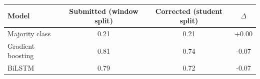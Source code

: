 \begin{tabular}{lccc}
\toprule
Model & Submitted (window split) & \textbf{Corrected (student split)} & $\Delta$ \\
\midrule
Majority class & 0.21 & 0.21 & +0.00 \\
Gradient boosting & 0.81 & 0.74 & -0.07 \\
BiLSTM & 0.79 & 0.72 & -0.07 \\
\bottomrule
\end{tabular}
